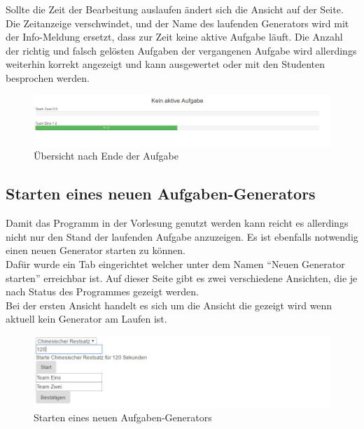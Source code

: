 Sollte die Zeit der Bearbeitung auslaufen ändert sich die Ansicht auf der Seite. Die Zeitanzeige verschwindet, und der Name des laufenden Generators wird mit der Info-Meldung ersetzt, dass zur Zeit keine aktive Aufgabe läuft. Die Anzahl der richtig und falsch gelösten Aufgaben der vergangenen Aufgabe wird allerdings weiterhin korrekt angezeigt und kann ausgewertet oder mit den Studenten besprochen werden.

\begin{figure}[htp]     %
\centering
\includegraphics[width=1\textwidth]{bilder/TaskOver} 
\caption[Übersicht nach Ende der Aufgabe]{Übersicht nach Ende der Aufgabe}
\end{figure} 


\subsection{Starten eines neuen Aufgaben-Generators}

Damit das Programm in der Vorlesung genutzt werden kann reicht es allerdings nicht nur den Stand der laufenden Aufgabe anzuzeigen. Es ist ebenfalls notwendig einen neuen Generator starten zu können. \\
Dafür wurde ein Tab eingerichtet welcher unter dem Namen ``Neuen Generator starten'' erreichbar ist.
Auf dieser Seite gibt es zwei verschiedene Ansichten, die je nach Status des Programmes gezeigt werden. \\

Bei der ersten Ansicht handelt es sich um die Ansicht die gezeigt wird wenn aktuell kein Generator am Laufen ist. \\

\begin{figure}[htp]     %
\centering
\includegraphics[width=1\textwidth]{bilder/StartNew} 
\caption[Starten eines neuen Aufgaben-Generators]{Starten eines neuen Aufgaben-Generators}
\end{figure} 

